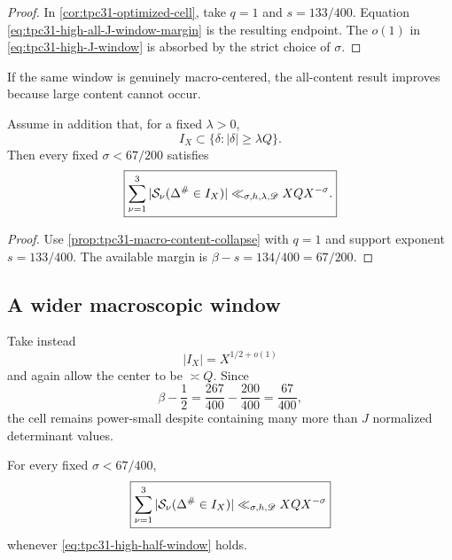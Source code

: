 \begin{proof}
In \cref{cor:tpc31-optimized-cell}, take $q=1$ and
$s=133/400$.  Equation
\eqref{eq:tpc31-high-all-J-window-margin} is the resulting endpoint.
The $o(1)$ in \eqref{eq:tpc31-high-J-window} is absorbed by the strict
choice of $\sigma$.
\end{proof}

If the same window is genuinely macro-centered, the all-content result
improves because large content cannot occur.

\begin{corollary}
\label{cor:tpc31-high-macro-J-window}
Assume in addition that, for a fixed $\lambda>0$,
\begin{equation}
 I_X\subset\{\delta:|\delta|\ge\lambda Q\}.
 \label{eq:tpc31-high-macro-J-condition}
\end{equation}
Then every fixed $\sigma<67/200$ satisfies
\begin{equation}
 \boxed{
 \sum_{\nu=1}^3|\mathcal S_\nu(\Delta^\#\in I_X)|
 \ll_{\sigma,h,\lambda,\mathscr D}XQX^{-\sigma}.}
 \label{eq:tpc31-high-macro-J-bound}
\end{equation}
\end{corollary}

\begin{proof}
Use \cref{prop:tpc31-macro-content-collapse} with $q=1$ and support
exponent $s=133/400$.  The available margin is
$\beta-s=134/400=67/200$.
\end{proof}

\subsection{A wider macroscopic window}

Take instead
\begin{equation}
 |I_X|=X^{1/2+o(1)}
 \label{eq:tpc31-high-half-window}
\end{equation}
and again allow the center to be $\asymp Q$.  Since
\begin{equation}
 \beta-\frac12
 =\frac{267}{400}-\frac{200}{400}
 =\boxed{\frac{67}{400}},
 \label{eq:tpc31-high-half-margin}
\end{equation}
the cell remains power-small despite containing many more than $J$
normalized determinant values.

\begin{corollary}
\label{cor:tpc31-high-half-window}
For every fixed $\sigma<67/400$,
\begin{equation}
 \boxed{
 \sum_{\nu=1}^3
 |\mathcal S_\nu(\Delta^\#\in I_X)|
 \ll_{\sigma,h,\mathscr D}XQX^{-\sigma}}
 \label{eq:tpc31-high-half-window-bound}
\end{equation}
whenever \eqref{eq:tpc31-high-half-window} holds.
\end{corollary}

